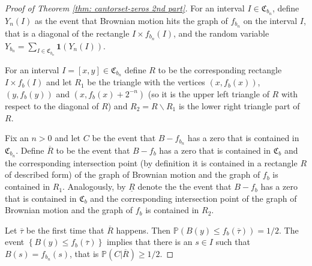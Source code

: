\documentclass[11pt,reqno]{amsart}
\theoremstyle{plain}
\theoremstyle{definition}
\theoremstyle{remark}
\begin{document}
\begin{proof}[Proof of Theorem \ref{thm: cantorset-zeros 2nd part}]
For an interval $I\in \mathfrak{C}_{b_n}$, define $Y_n(I)$ as the event that Brownian motion hits the graph of $f_{b_n}$ on the interval $I$, that is a diagonal of the rectangle $I\times f_{b_n}(I)$, and the random variable $Y_{b_n} = \sum_{I \in \mathfrak{C}_{b_n}}\mathbf{1}(Y_n(I))$.

For an interval $I =[x,y] \in \mathfrak{C}_{b_n}$ define $R$ to be the corresponding rectangle $I\times f_b(I)$ and let $R_1$ be the triangle with the vertices $(x,f_b(x))$, $(y,f_b(y))$ and $(x,f_b(x)+2^{-n})$ (so it is the upper left triangle of $R$ with respect to the diagonal of $R$) and $R_2 = R \backslash R_1$ is the lower right triangle part of $R$.

Fix an $n>0$ and let $C$ be the event that $B-f_{b_n}$ has a zero that is contained in $\mathfrak{C}_{b_n}$. Define $\overline{R}$ to be the event that $B-f_b$ has a zero that is contained in $\mathfrak{C}_{b}$ and the corresponding intersection point (by definition it is contained in a rectangle $R$ of described form) of the graph of Brownian motion and the graph of $f_b$ is contained in $R_1$. Analogously, by $\underline{R}$ denote the the event that $B-f_b$ has a zero that is contained in $\mathfrak{C}_{b}$ and the corresponding intersection point of the graph of Brownian motion and the graph of $f_b$ is contained in $R_2$.

Let $\overline{\tau}$ be the first time that $\overline{R}$ happens. Then $\mathbb{P}(B(y)\leq f_{b}(\overline{\tau}))=1/2$. The event $\left\lbrace B(y)\leq f_{b}(\overline{\tau})\right\rbrace $ implies that there is an $s\in I$ such that $B(s)=f_{b_n}(s)$, that is $\mathbb{P}(C |\overline{R}) \geq 1/2$.


\end{proof}
\end{document}
